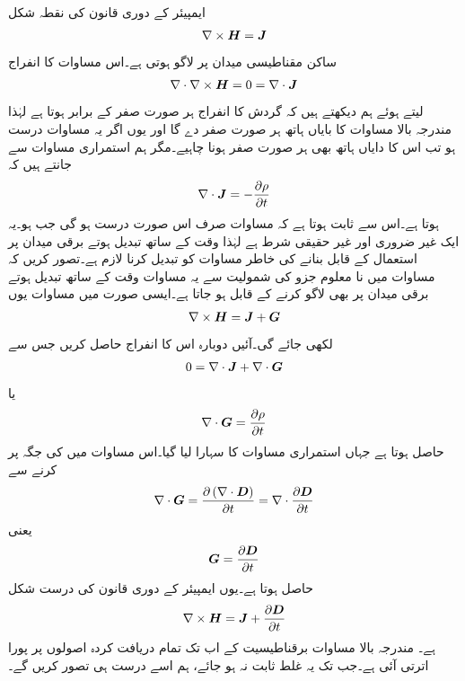 ایمپیئر کے دوری قانون کی نقطہ شکل
\begin{align}\label{مساوات_میکس_ویل_ایمپیئر_دوری_نقطہ_صورت}
\nabla \times {\ensuremath{{\boldsymbol{H}}}}={{\boldsymbol{J}}}
\end{align}
ساکن مقناطیسی میدان پر لاگو ہوتی ہے۔اس مساوات کا انفراج
\begin{align*}
\nabla \cdot \nabla \times {\ensuremath{{\boldsymbol{H}}}}=0=\nabla \cdot {\ensuremath{{\boldsymbol{J}}}}
\end{align*}
 لیتے ہوئے ہم دیکھتے ہیں کہ گردش کا انفراج ہر صورت صفر کے برابر ہوتا ہے لہٰذا مندرجہ بالا مساوات کا بایاں ہاتھ ہر صورت صفر دے گا اور یوں اگر یہ مساوات درست ہو تب اس کا دایاں ہاتھ بھی ہر صورت صفر ہونا چاہیے۔مگر ہم استمراری  مساوات سے جانتے ہیں کہ
\begin{align}
\nabla \cdot {\ensuremath{{\boldsymbol{J}}}}=-\frac{\partial \rho}{\partial t}
\end{align} 
ہوتا ہے۔اس سے ثابت ہوتا ہے کہ مساوات  صرف اس صورت درست ہو گی جب  ہو۔یہ ایک غیر ضروری اور غیر حقیقی شرط ہے لہٰذا وقت کے ساتھ تبدیل ہوتے برقی میدان پر استعمال کے قابل بنانے کی خاطر  مساوات  کو تبدیل کرنا لازم ہے۔تصور کریں کہ مساوات  میں نا معلوم جزو  کی شمولیت سے یہ مساوات وقت  کے ساتھ تبدیل ہوتے برقی میدان پر بھی لاگو کرنے کے قابل ہو جاتا ہے۔ایسی صورت میں مساوات  یوں
\begin{align*}
\nabla \times {\ensuremath{{\boldsymbol{H}}}}={{\boldsymbol{J}}}+{{\boldsymbol{G}}}
\end{align*}
لکھی جائے گی۔آئیں دوبارہ اس کا انفراج حاصل کریں جس سے
\begin{align*}
0=\nabla \cdot {\ensuremath{{\boldsymbol{J}}}}+\nabla \cdot {\ensuremath{{\boldsymbol{G}}}}
\end{align*}
یا
\begin{align*}
\nabla \cdot {\ensuremath{{\boldsymbol{G}}}}=\frac{\partial \rho}{\partial t}
\end{align*}
حاصل ہوتا ہے جہاں استمراری مساوات کا سہارا لیا گیا۔اس مساوات میں  کی جگہ  پر کرنے سے
\begin{align*}
\nabla \cdot {\ensuremath{{\boldsymbol{G}}}}=\frac{\partial \left(\nabla \cdot {\ensuremath{{\boldsymbol{D}}}} \right)}{\partial t}=\nabla \cdot \frac{\partial {\ensuremath{{\boldsymbol{D}}}}}{\partial t}
\end{align*}
یعنی
 \begin{align*}
{\ensuremath{{\boldsymbol{G}}}}=\frac{\partial {\ensuremath{{\boldsymbol{D}}}}}{\partial t}
\end{align*}
حاصل ہوتا ہے۔یوں ایمپیئر کے دوری قانون کی درست شکل
\begin{align}\label{مساوات-میکس_ویل_دوسری_مساوات_نقطہ_شکل}
\nabla \times {\ensuremath{{\boldsymbol{H}}}}={{\boldsymbol{J}}}+\frac{\partial {\ensuremath{{\boldsymbol{D}}}}}{\partial t}
\end{align}
ہے۔ مندرجہ بالا مساوات برقناطیسیت کے اب تک تمام دریافت کردہ اصولوں پر پورا اترتی آئی ہے۔جب تک یہ غلط ثابت نہ ہو جائے، ہم اسے درست ہی تصور کریں گے۔

